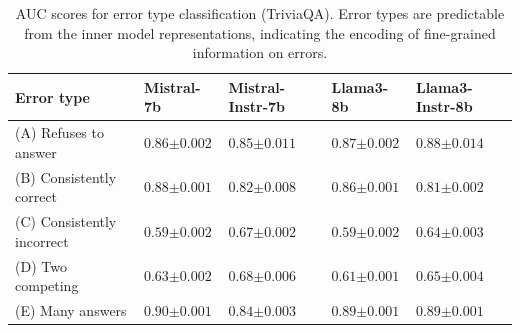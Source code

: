 \begin{table}[t]
    \centering
    \caption{AUC scores for error type classification (TriviaQA). Error types are predictable from the inner model representations, indicating the encoding of fine-grained information on errors.}
    \begin{tabular}{l|llll}
    \toprule
       Error type & Mistral-7b & Mistral-Instr-7b & Llama3-8b & Llama3-Instr-8b \\
       \midrule
         (A) Refuses to answer & $0.86 \scriptscriptstyle{\pm 0.002}$ & $0.85 \scriptscriptstyle{\pm 0.011}$ & $0.87 \scriptscriptstyle{\pm 0.002}$ & $0.88 \scriptscriptstyle{\pm 0.014}$ \\
         (B) Consistently correct & $0.88 \scriptscriptstyle{\pm 0.001}$ & $0.82 \scriptscriptstyle{\pm 0.008}$ & $0.86 \scriptscriptstyle{\pm 0.001}$  & $0.81 \scriptscriptstyle{\pm 0.002}$ \\
         (C) Consistently incorrect & $0.59 \scriptscriptstyle{\pm 0.002}$ & $0.67 \scriptscriptstyle{\pm 0.002}$ & $0.59 \scriptscriptstyle{\pm 0.002}$ & $0.64 \scriptscriptstyle{\pm 0.003}$\\
         (D) Two competing & $0.63 \scriptscriptstyle{\pm 0.002}$ & $0.68 \scriptscriptstyle{\pm 0.006}$ & $0.61 \scriptscriptstyle{\pm 0.001}$ & $0.65 \scriptscriptstyle{\pm 0.004}$ \\
         (E) Many answers &  $0.90 \scriptscriptstyle{\pm 0.001}$ & $0.84 \scriptscriptstyle{\pm 0.003}$ & $0.89 \scriptscriptstyle{\pm 0.001}$ & $0.89 \scriptscriptstyle{\pm 0.001}$ \\
    \bottomrule
    \end{tabular}
    \label{tab:error_type_classification}
\end{table}
